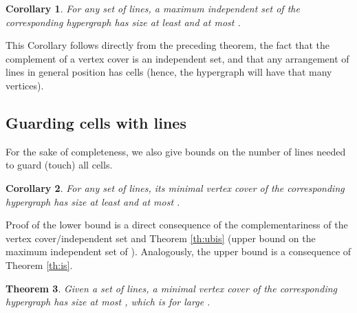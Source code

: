 \documentclass[11pt,a4paper]{article}
\newtheorem{theorem}{Theorem}
\newtheorem{corollary}[theorem]{Corollary}
\begin{document}
\begin{corollary}\label{cor:CZIS}
For any set  of  lines, a maximum independent set of the corresponding  hypergraph has size at least  and at most .
\end{corollary}
This Corollary follows directly from the preceding theorem, the fact that the complement of a vertex cover is an independent set, and that  
any arrangement of  lines in general position has  cells (hence, the  hypergraph will have that many vertices).


\subsection{Guarding cells with lines}
For the sake of completeness, we also give bounds on the number of lines needed to guard (touch) all cells.

\begin{corollary}\label{cor:CL}
For any set  of  lines, its minimal vertex cover of the corresponding  hypergraph has size at least  and at most .
\end{corollary}
Proof of the lower bound is a direct consequence of the complementariness of the vertex cover/independent set and Theorem \ref{th:ubis} (upper bound on the maximum independent set of ). Analogously, the upper bound is a consequence of Theorem \ref{th:is}.
\iffalse
\begin{theorem}\label{UB:guardwithcells}
Given a set  of  lines, a minimal vertex cover of the corresponding  hypergraph has size at most , which is  for large .
\end{theorem}
\end{document}
